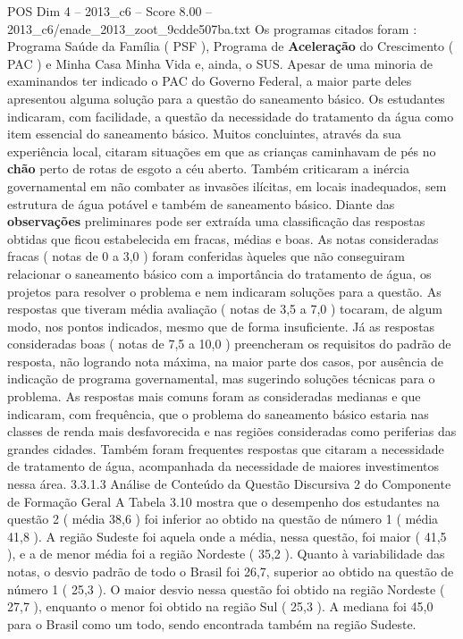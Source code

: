 \begin{textsample}{POS Dim 4 – 2013\_c6 – Score 8.00 – 2013\_c6/enade\_2013\_zoot\_9cdde507ba.txt}
Os programas citados foram : Programa Saúde da Família ( PSF ), Programa de \textbf{Aceleração} do Crescimento ( PAC ) e Minha Casa Minha Vida e, ainda, o SUS.
Apesar de uma minoria de examinandos ter indicado o PAC do Governo Federal, a maior parte deles apresentou alguma solução para a questão do saneamento básico.
Os estudantes indicaram, com facilidade, a questão da necessidade do tratamento da água como item essencial do saneamento básico.
Muitos concluintes, através da sua experiência local, citaram situações em que as crianças caminhavam de pés no \textbf{chão} perto de rotas de esgoto a céu aberto.
Também criticaram a inércia governamental em não combater as invasões ilícitas, em locais inadequados, sem estrutura de água potável e também de saneamento básico.
Diante das \textbf{observações} preliminares pode ser extraída uma classificação das respostas obtidas que ficou estabelecida em fracas, médias e boas.
As notas consideradas fracas ( notas de 0 a 3,0 ) foram conferidas àqueles que não conseguiram relacionar o saneamento básico com a importância do tratamento de água, os projetos para resolver o problema e nem indicaram soluções para a questão.
As respostas que tiveram média avaliação ( notas de 3,5 a 7,0 ) tocaram, de algum modo, nos pontos indicados, mesmo que de forma insuficiente.
Já as respostas consideradas boas ( notas de 7,5 a 10,0 ) preencheram os requisitos do padrão de resposta, não logrando nota máxima, na maior parte dos casos, por ausência de indicação de programa governamental, mas sugerindo soluções técnicas para o problema.
As respostas mais comuns foram as consideradas medianas e que indicaram, com frequência, que o problema do saneamento básico estaria nas classes de renda mais desfavorecida e nas regiões consideradas como periferias das grandes cidades.
Também foram frequentes respostas que citaram a necessidade de tratamento de água, acompanhada da necessidade de maiores investimentos nessa área. 3.3.1.3 Análise de Conteúdo da Questão Discursiva 2 do Componente de Formação Geral A Tabela 3.10 mostra que o desempenho dos estudantes na questão 2 ( média 38,6 ) foi inferior ao obtido na questão de número 1 ( média 41,8 ).
A região Sudeste foi aquela onde a média, nessa questão, foi maior ( 41,5 ), e a de menor média foi a região Nordeste ( 35,2 ).
Quanto à variabilidade das notas, o desvio padrão de todo o Brasil foi 26,7, superior ao obtido na questão de número 1 ( 25,3 ).
O maior desvio nessa questão foi obtido na região Nordeste ( 27,7 ), enquanto o menor foi obtido na região Sul ( 25,3 ).
A mediana foi 45,0 para o Brasil como um todo, sendo encontrada também na região Sudeste.

\end{textsample}
